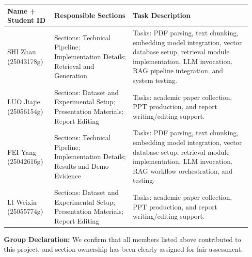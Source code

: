 \documentclass[11pt,a4paper]{article}
\begin{document}
\vspace{0.8em}

\vspace{1em}
\begin{longtable}{|p{}|p{}|p{}|}
\hline
\textbf{Name + Student ID} & \textbf{Responsible Sections} & \textbf{Task Description} \\
\hline
SHI Zhan (25043178g) &
Sections: \newline Technical Pipeline; Implementation Details; Retrieval and Generation &
Tasks: PDF parsing, text chunking, embedding model integration, vector database setup, retrieval module implementation, LLM invocation, RAG pipeline integration, and system testing. \\
\hline
LUO Jiajie (25056154g) &
Sections: \newline Dataset and Experimental Setup; Presentation Materials; Report Editing &
Tasks: academic paper collection, PPT production, and report writing/editing support. \\
\hline
FEI Yang (25042616g) &
Sections: \newline Technical Pipeline; Implementation Details; Results and Demo Evidence &
Tasks: PDF parsing, text chunking, embedding model integration, vector database setup, retrieval module implementation, LLM invocation, RAG workflow orchestration, and testing. \\
\hline
LI Weixin (25055774g) &
Sections: \newline Dataset and Experimental Setup; Presentation Materials; Report Editing &
Tasks: academic paper collection, PPT production, and report writing/editing support. \\
\hline
\end{longtable}

\vfill
\textbf{Group Declaration:}
We confirm that all members listed above contributed to this project, and section ownership has been clearly assigned for fair assessment.
\end{document}
